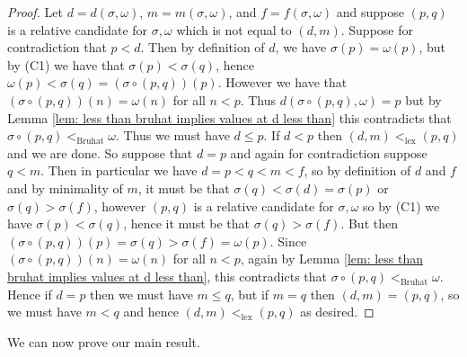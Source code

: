 \documentclass[oneside,11pt,reqno]{amsart}
\theoremstyle{definition}
\newtheorem{proof techniques}{Proof Techniques}
\begin{document}
\begin{proof}
    Let $d = d(\sigma , \omega)$, $m = m(\sigma , \omega)$, and $f = f(\sigma , \omega)$ and suppose $(p , q)$ is a relative candidate for $\sigma , \omega$ which is not equal to $(d , m)$. Suppose for contradiction that $p < d$. Then by definition of $d$, we have $\sigma(p) = \omega(p)$, but by (C1) we have that $\sigma(p) < \sigma(q)$, hence $\omega(p) < \sigma(q) = (\sigma \circ (p , q))(p)$. However we have that $(\sigma \circ (p , q))(n) = \omega(n)$ for all $n < p$. Thus $d(\sigma \circ (p , q) , \omega) = p$ but by Lemma \ref{lem: less than bruhat implies values at d less than} this contradicts that $\sigma \circ (p , q) <_\text{Bruhat} \omega$. Thus we must have $d \leq p$. If $d < p$ then $(d , m) <_\text{lex} (p , q)$ and we are done. So suppose that $d = p$ and again for contradiction suppose $q < m$. Then in particular we have $d = p < q < m < f$, so by definition of $d$ and $f$ and by minimality of $m$, it must be that $\sigma(q) < \sigma(d) = \sigma(p)$ or $\sigma(q) > \sigma(f)$, however $(p , q)$ is a relative candidate for $\sigma, \omega$ so by (C1) we have $\sigma(p) < \sigma(q)$, hence it must be that $\sigma(q) > \sigma(f)$. But then $(\sigma \circ (p , q))(p) = \sigma(q) > \sigma(f) = \omega(p)$. Since $(\sigma \circ (p , q))(n) = \omega(n)$ for all $n < p$, again by Lemma \ref{lem: less than bruhat implies values at d less than}, this contradicts that $\sigma \circ (p , q) <_\text{Bruhat} \omega$. Hence if $d = p$ then we must have $m \leq q$, but if $m = q$ then $(d , m) = (p , q)$, so we must have $m < q$ and hence $(d , m) <_\text{lex} (p , q)$ as desired. 
\end{proof}

We can now prove our main result.
\end{document}
